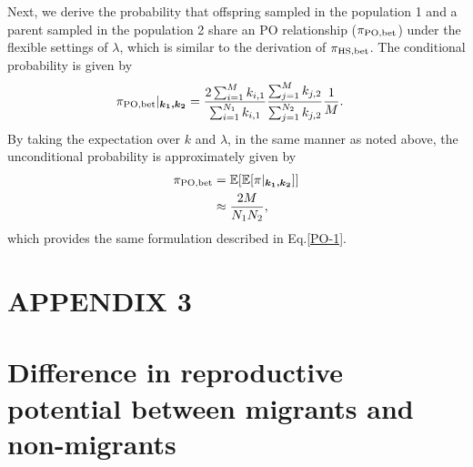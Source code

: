 \documentclass[12pt, English]{article}
\begin{document}
\begin{spacing}{1.9}
Next, we derive the probability that offspring sampled in the population 1 and a parent sampled in the population 2 share an PO relationship ($\pi_{\rm PO,bet}$) under the flexible settings of $\lambda$, which is similar to the derivation of $\pi_{\rm HS,bet}$. The conditional probability is given by
\begin{align}
\pi_{\rm PO,bet} | _{\boldsymbol{k_1, k_2}} &= \frac{ 2\sum_{i=1}^M k_{i,1} } { \sum_{i=1}^{N_1} k_{i,1} } \frac{ \sum_{j=1}^M k_{j,2} } { \sum_{j=1}^{N_2} k_{j,2} } \frac{1}{M}.
\end{align}
By taking the expectation over $k$ and $\lambda$, in the same manner as noted above, the unconditional probability is approximately given by
\begin{align}
\pi_{\rm PO,bet} &= \mathbb{E}[\mathbb{E}[\pi | _{\boldsymbol{k_1, k_2}}]] \nonumber\\ 
&\approx  \frac{2M}{N_{1}N_{2}},
\end{align}
which provides the same formulation described in Eq.\ref{PO-1}.

\section*{APPENDIX 3}

\section*{Difference in reproductive potential between migrants and non-migrants}


\end{spacing}
\end{document}
